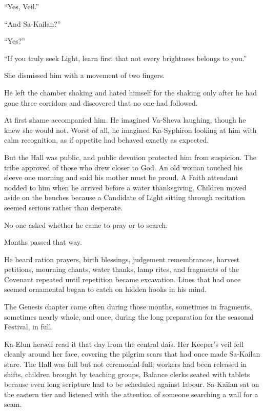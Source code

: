“Yes, Veil.”\par

“And Sa-Kailan?”\par

“Yes?”\par

“If you truly seek Light, learn first that not every brightness belongs to you.”\par

She dismissed him with a movement of two fingers.\par

He left the chamber shaking and hated himself for the shaking only after he had gone three corridors and discovered that no one had followed.\par

At first shame accompanied him. He imagined Va-Sheva laughing, though he knew she would not. Worst of all, he imagined Ka-Syphiron looking at him with calm recognition, as if appetite had behaved exactly as expected.\par

But the Hall was public, and public devotion protected him from suspicion. The tribe approved of those who drew closer to God. An old woman touched his sleeve one morning and said his mother must be proud. A Faith attendant nodded to him when he arrived before a water thanksgiving. Children moved aside on the benches because a Candidate of Light sitting through recitation seemed serious rather than desperate.\par

No one asked whether he came to pray or to search.\par

Months passed that way.\par

He heard ration prayers, birth blessings, judgement remembrances, harvest petitions, mourning chants, water thanks, lamp rites, and fragments of the Covenant repeated until repetition became excavation. Lines that had once seemed ornamental began to catch on hidden hooks in his mind.\par

The Genesis chapter came often during those months, sometimes in fragments, sometimes nearly whole, and once, during the long preparation for the seasonal Festival, in full.\par

Ka-Elun herself read it that day from the central dais. Her Keeper’s veil fell cleanly around her face, covering the pilgrim scars that had once made Sa-Kailan stare. The Hall was full but not ceremonial-full; workers had been released in shifts, children brought by teaching groups, Balance clerks seated with tablets because even long scripture had to be scheduled against labour. Sa-Kailan sat on the eastern tier and listened with the attention of someone searching a wall for a seam.\par

